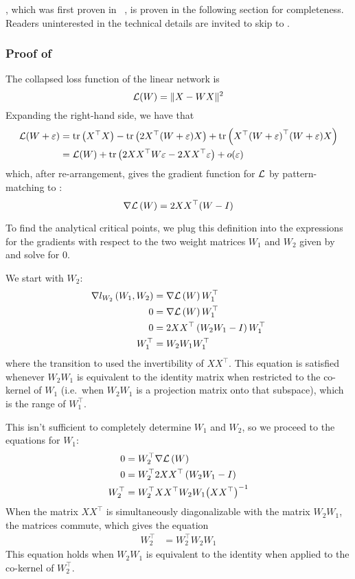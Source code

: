\documentclass[../../thesis.tex]{subfiles}
\begin{document}
,
which was first proven in%
~\cite{baldi1989},
is proven in the following section
for completeness.
Readers uninterested in the technical details
are invited to skip to
.

\subsubsection{Proof of }%

The collapsed loss function of the linear network is
\begin{equation}
	{\mathcal{L}}(W) = \lVert X - WX\rVert^2
\end{equation}
\noindent Expanding the right-hand side,
we have that
\begin{align}
	{\mathcal{L}}(W + \varepsilon)
	&= \mathrm{tr}\left(X^\top X\right) - \mathrm{tr}\left(2X^\top(W+\varepsilon)X\right)
	+ \mathrm{tr}\left(X^\top{(W+\varepsilon)}^\top(W+\varepsilon)X\right)\\
	&= {\mathcal{L}}(W) + \mathrm{tr}\left(2 XX^\top W \varepsilon - 2XX^\top\varepsilon\right) + o(\varepsilon)
\end{align}
\noindent which, after re-arrangement, gives the gradient function
for ${\mathcal{L}}$ by pattern-matching to :
\begin{equation}
	\nabla{\mathcal{L}}\left(W\right) = 2 XX^\top (W - I)
\end{equation}

To find the analytical critical points,
we plug this definition into
the expressions for the gradients with respect to
the two weight matrices $W_1$ and $W_2$
given by 
and solve for 0.

We start with $W_2$:
\begin{align}
	\grad{l_{W_2}}{W_1, W_2} &= \grad{\cL}{W} W_1^\top\\
	0 &= \grad{\cL}{W} W_1^\top\\
	0 &= 2 XX^\top\left(W_2 W_1 - I\right) W_1^\top\\
	W_1^\top &= W_2W_1 W_1^\top\equationlabel{last-line-W2-grad}
\end{align}
\noindent where the transition to 
used the invertibility of $XX^\top$.
This equation is satisfied
whenever $W_2 W_1$ is equivalent to the identity
matrix when restricted to the co-kernel of $W_1$
(i.e.~when $W_2W_1$ is a projection matrix onto that subspace),
which is the range of $W_1^\top$.

This isn't sufficient to completely determine
$W_1$ and $W_2$,
so we proceed to the equations
for $W_1$:
\begin{align}
	0 &= W_2^\top\nabla{\mathcal{L}}\left(W\right)\\
	0 &= W_2^\top 2 XX^\top\left(W_2 W_1 - I\right)\\
	W_2^\top &= W_2^\top XX^\top W_2 W_1 {\left(X X^\top\right)}^{-1}
\end{align}
\noindent When the matrix $XX^\top$
is simultaneously diagonalizable with the matrix $W_2W_1$,
the matrices commute,
which gives the equation
\begin{align}
	W_2^\top &= W_2^\top W_2 W_1
\end{align}
\noindent
This equation holds when $W_2 W_1$ is equivalent to the identity
when applied to the co-kernel of $W_2^\top$.
\end{document}
